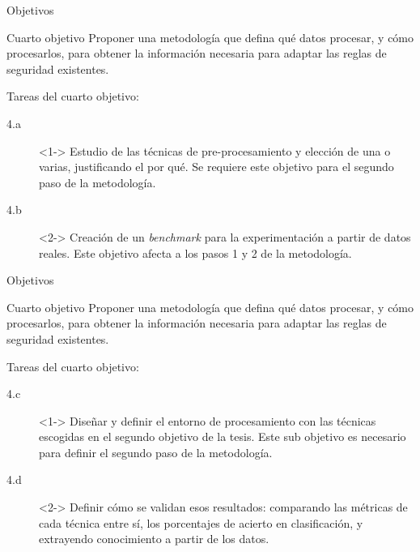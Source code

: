 \documentclass{beamer}
\begin{document}
\begin{frame}{Objetivos}

\begin{block}{Cuarto objetivo}
Proponer una metodología que defina qué datos procesar, y cómo procesarlos, para obtener la información necesaria para adaptar las reglas de seguridad existentes.
\end{block}

Tareas del cuarto objetivo:

\begin{small}
\begin{description}
  \item[4.a]<1-> Estudio de las técnicas de pre-procesamiento y elección de una o varias, justificando el por qué. Se requiere este objetivo para el segundo paso de la metodología.
  \item[4.b]<2-> Creación de un \textit{benchmark} para la experimentación a partir de datos reales. Este objetivo afecta a los pasos 1 y 2 de la metodología.
\end{description}
\end{small}

\end{frame}

\begin{frame}{Objetivos}

\begin{block}{Cuarto objetivo}
Proponer una metodología que defina qué datos procesar, y cómo procesarlos, para obtener la información necesaria para adaptar las reglas de seguridad existentes.
\end{block}

Tareas del cuarto objetivo:

\begin{small}
\begin{description}
  \item[4.c]<1-> Diseñar y definir el entorno de procesamiento con las técnicas escogidas en el segundo objetivo de la tesis. Este sub objetivo es necesario para definir el segundo paso de la metodología.
  \item[4.d]<2-> Definir cómo se validan esos resultados: comparando las métricas de cada técnica entre sí, los porcentajes de acierto en clasificación, y extrayendo conocimiento a partir de los datos.
\end{description}
\end{small}

\end{frame}
\end{document}
